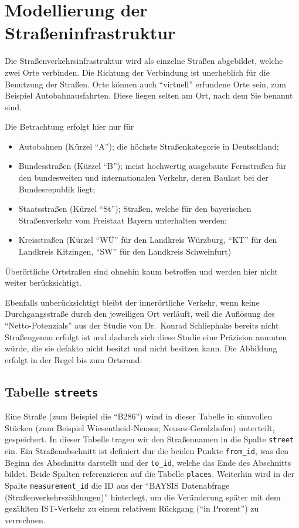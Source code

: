 \documentclass[fontsize=12pt,a4paper]{scrreprt}
\begin{document}
\section{Modellierung der Straßeninfrastruktur}

Die Straßenverkehrsinfrastruktur wird als einzelne Straßen abgebildet, welche zwei Orte verbinden. Die Richtung der Verbindung ist unerheblich für die Benutzung der Straßen. Orte können auch \enquote{virtuell} erfundene Orte sein, zum Beispiel Autobahnausfahrten. Diese liegen selten am Ort, nach dem Sie benannt sind.

\vspace{1em}

Die Betrachtung erfolgt hier nur für

\begin{itemize}
        \item Autobahnen (Kürzel \enquote{A}); die höchste Straßenkategorie in Deutschland;
        \item Bundesstraßen (Kürzel \enquote{B}); meist hochwertig ausgebaute Fernstraßen für den bundesweiten und internationalen Verkehr, deren Baulast bei der Bundesrepublik liegt;
        \item Staatsstraßen (Kürzel \enquote{St}); Straßen, welche für den bayerischen Straßenverkehr vom Freistaat Bayern unterhalten werden;
        \item Kreisstraßen (Kürzel \enquote{WÜ} für den Landkreis Würzburg, \enquote{KT} für den Landkreis Kitzingen, \enquote{SW} für den Landkreis Schweinfurt)
\end{itemize}

Überörtliche Ortstraßen sind ohnehin kaum betroffen und werden hier nicht weiter berücksichtigt.

Ebenfalls unberücksichtigt bleibt der innerörtliche Verkehr, wenn keine Durchgangsstraße durch den jeweiligen Ort verläuft, weil die Auflösung des \enquote{Netto-Potenzials} aus der Studie von Dr.\ Konrad Schliephake bereits nicht Straßengenau erfolgt ist und dadurch sich diese Studie eine Präzision anmuten würde, die sie defakto nicht besitzt und nicht besitzen kann. Die Abbildung erfolgt in der Regel bis zum Ortsrand.

\subsection{Tabelle \texttt{streets}}

Eine Straße (zum Beispiel die \enquote{B286}) wind in dieser Tabelle in sinnvollen Stücken (zum Beispiel Wiesentheid-Neuses; Neuses-Gerolzhofen) unterteilt, gespeichert. In dieser Tabelle tragen wir den Straßennamen in die Spalte \texttt{street} ein. Ein Straßenabschnitt ist definiert dur die beiden Punkte \texttt{from_id}, was den Beginn des Abschnitts darstellt und der \texttt{to_id}, welche das Ende des Abschnitts bildet. Beide Spalten referenzieren auf die Tabelle \texttt{places}. Weiterhin wird in der Spalte \texttt{measurement_id} die ID aus der \enquote{BAYSIS Datenabfrage (Straßenverkehrszählungen)} hinterlegt, um die Veränderung später mit dem gezählten IST-Verkehr zu einem relativem Rückgang (\enquote{in Prozent}) zu verrechnen.
\end{document}
